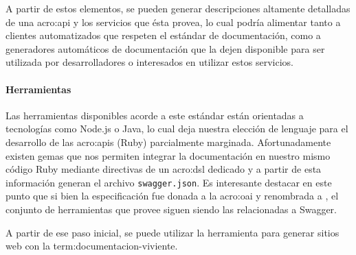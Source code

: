 A partir de estos elementos, se pueden generar descripciones altamente detalladas de una \gls{acro:api} y los servicios que ésta provea, lo cual podría alimentar tanto a clientes automatizados que respeten el estándar de documentación, como a generadores automáticos de documentación que la dejen disponible para ser utilizada por desarrolladores o interesados en utilizar estos servicios.

\paragraph{Herramientas}

Las herramientas disponibles acorde a este estándar están orientadas a tecnologías como Node.js o Java, lo cual deja nuestra elección de lenguaje para el desarrollo de las \glspl{acro:api} (Ruby) parcialmente marginada. Afortunadamente existen gemas que nos permiten integrar la documentación en nuestro mismo código Ruby mediante directivas de un \gls{acro:dsl} dedicado y a partir de esta información generan el archivo \texttt{swagger.json}. Es interesante destacar en este punto que si bien la especificación fue donada a la \gls{acro:oai} y renombrada a \oaispec, el conjunto de herramientas que provee siguen siendo las relacionadas a Swagger.

A partir de ese paso inicial, se puede utilizar la herramienta  para generar sitios web con la \gls{term:documentacion-viviente}.
